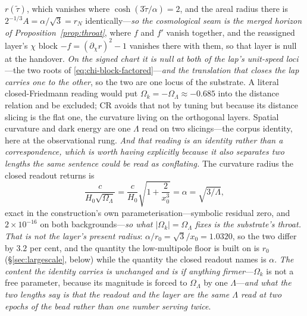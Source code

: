 \documentclass[11pt,a4paper]{article}
\theoremstyle{plain}
\theoremstyle{definition}
\theoremstyle{remark}
\begin{document}
$r(\tilde\tau)$, which vanishes where $\cosh(3\tilde\tau/\alpha)=2$, and the areal radius there is $2^{-1/3}A=\alpha/\sqrt3=r_N$ identically---\emph{so the cosmological seam is the merged horizon of Proposition~\ref{prop:throat}}, where $f$ and $f'$ vanish together, and the reassigned layer's $\chi$ block $-f=(\partial_\chi r)^2-1$ vanishes there with them, so that layer is null at the handover. \emph{On the signed chart it is null at both of the lap's unit-speed loci}---the two roots of \eqref{eq:chi-block-factored}---\emph{and the translation that closes the lap carries one to the other}, so the two are one locus of the substrate. A literal closed-Friedmann reading would put $\Omega_k=-\Omega_\Lambda\approx-0.685$ into the distance relation and be excluded; CR avoids that not by tuning but because its distance slicing is the flat one, the curvature living on the orthogonal layers. Spatial curvature and dark energy are one $\Lambda$ read on two slicings---the corpus identity, here at the observational rung. \emph{And that reading is an identity rather than a correspondence, which is worth having explicitly because it also separates two lengths the same sentence could be read as conflating.} The curvature radius the closed readout returns is
\begin{equation}
\frac{c}{H_0\sqrt{\Omega_\Lambda}}=\frac{c}{H_0}\sqrt{1+\frac{2}{x_0^{3}}}=\alpha=\sqrt{3/\Lambda},
\label{eq:closed-readout-radius}
\end{equation}
exact in the construction's own parameterisation---symbolic residual zero, and $2\times10^{-16}$ on both backgrounds---\emph{so what $|\Omega_k|=\Omega_\Lambda$ fixes is the substrate's throat.} \emph{That is not the layer's present radius}: $\alpha/r_0=\sqrt3/x_0=1.0320$, so the two differ by $3.2$ per cent, and the quantity the low-multipole floor is built on is $r_0$ (\S\ref{sec:largescale}, below) while the quantity the closed readout names is $\alpha$. \emph{The content the identity carries is unchanged and is if anything firmer}---$\Omega_k$ is not a free parameter, because its magnitude is forced to $\Omega_\Lambda$ by one $\Lambda$---\emph{and what the two lengths say is that the readout and the layer are the same $\Lambda$ read at two epochs of the bead rather than one number serving twice}.
\end{document}
